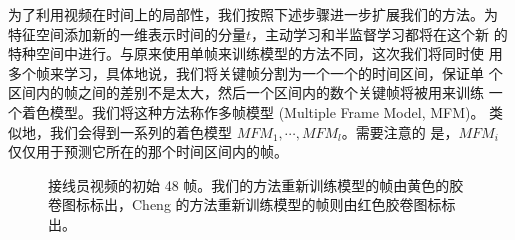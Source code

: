 为了利用视频在时间上的局部性，我们按照下述步骤进一步扩展我们的方法。为
特征空间添加新的一维表示时间的分量$t$，主动学习和半监督学习都将在这个新
的特种空间中进行。与原来使用单帧来训练模型的方法不同，这次我们将同时使
用多个帧来学习，具体地说，我们将关键帧分割为一个一个的时间区间，保证单
个区间内的帧之间的差别不是太大，然后一个区间内的数个关键帧将被用来训练
一个着色模型。我们将这种方法称作多帧模型 (Multiple Frame Model, MFM)。
类似地，我们会得到一系列的着色模型 $MFM_1, \cdots, MFM_l$。需要注意的
是，$MFM_i$仅仅用于预测它所在的那个时间区间内的帧。

\begin{figure}[t]
  \center {}
  \hspace{4mm} 
\caption{接线员视频的初始 48 帧。我们的方法重新训练模型的帧由黄色的胶
  卷图标标出，Cheng 的方法重新训练模型的帧则由红色胶卷图标标出。}
\label{fig:telemarket}
\end{figure}


